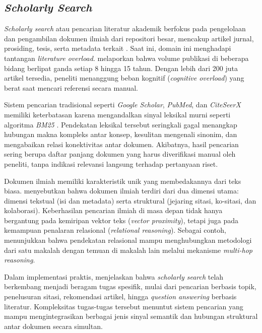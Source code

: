 \subsection{\textit{Scholarly Search}}

\textit{Scholarly search} atau pencarian literatur akademik berfokus pada pengelolaan dan pengambilan dokumen ilmiah dari repositori besar, mencakup artikel jurnal, prosiding, tesis, serta metadata terkait \citep{Kasela_2025}. Saat ini, domain ini menghadapi tantangan \textit{literature overload}. \citet{Larsen2010} melaporkan bahwa volume publikasi di beberapa bidang berlipat ganda setiap 8 hingga 15 tahun. Dengan lebih dari 200 juta artikel tersedia, peneliti menanggung beban kognitif (\textit{cognitive overload}) yang berat saat mencari referensi secara manual.

Sistem pencarian tradisional seperti \textit{Google Scholar}, \textit{PubMed}, dan \textit{CiteSeerX} memiliki keterbatasan karena mengandalkan sinyal leksikal murni seperti algoritma \textit{BM25} \citep{10.1007/s11192-020-03690-4}. Pendekatan leksikal tersebut seringkali gagal menangkap hubungan makna kompleks antar konsep, kesulitan mengenali sinonim, dan mengabaikan relasi konektivitas antar dokumen. Akibatnya, hasil pencarian sering berupa daftar panjang dokumen yang harus diverifikasi manual oleh peneliti, tanpa indikasi relevansi langsung terhadap pertanyaan riset.

Dokumen ilmiah memiliki karakteristik unik yang membedakannya dari teks biasa. \citet{Shen2016ModelingTA} menyebutkan bahwa dokumen ilmiah terdiri dari dua dimensi utama: dimensi tekstual (isi dan metadata) serta struktural (jejaring sitasi, ko-sitasi, dan kolaborasi). Keberhasilan pencarian ilmiah di masa depan tidak hanya bergantung pada kemiripan vektor teks (\textit{vector proximity}), tetapi juga pada kemampuan penalaran relasional (\textit{relational reasoning}). Sebagai contoh, \citet{avgoren2025enhancing} menunjukkan bahwa pendekatan relasional mampu menghubungkan metodologi dari satu makalah dengan temuan di makalah lain melalui mekanisme \textit{multi-hop reasoning}.

Dalam implementasi praktis, \citet{9522111} menjelaskan bahwa \textit{scholarly search} telah berkembang menjadi beragam tugas spesifik, mulai dari pencarian berbasis topik, penelusuran sitasi, rekomendasi artikel, hingga \textit{question answering} berbasis literatur. Kompleksitas tugas-tugas tersebut menuntut sistem pencarian yang mampu mengintegrasikan berbagai jenis sinyal semantik dan hubungan struktural antar dokumen secara simultan.

